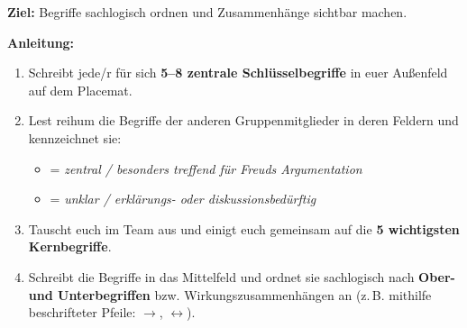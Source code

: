 \documentclass[a4paper, 11pt, parskip=half]{scrartcl}
\begin{document}
\begin{tcolorbox}[
    enhanced, colback=lightBlue, colframe=primaryBlue, boxrule=0.8pt, arc=1mm,
    title=\textbf{Methode: Strukturlegetechnik},
    fonttitle=\small\bfseries\color{white},
    boxed title style={colback=primaryBlue, arc=0mm, boxrule=0pt},
    attach boxed title to top left={yshift=-2mm, xshift=2mm},
    boxsep=5pt, bottom=6pt, top=7pt
]
\small\sffamily
\textbf{Ziel:} Begriffe sachlogisch ordnen und Zusammenhänge sichtbar machen.\par\smallskip
\textbf{Anleitung:}
\begin{enumerate}[leftmargin=0.55cm, itemsep=0.08cm, topsep=0.04cm]
    \item Schreibt jede/r für sich \textbf{5--8 zentrale Schlüsselbegriffe} in euer Außenfeld auf dem Placemat.
    \item Lest reihum die Begriffe der anderen Gruppenmitglieder in deren Feldern und kennzeichnet sie:
    \begin{itemize}[leftmargin=0.4cm, itemsep=0.02cm, label=\color{primaryBlue}\textbullet]
        \item[\textbf{!}] = \textit{zentral / besonders treffend für Freuds Argumentation}
        \item[\textbf{?}] = \textit{unklar / erklärungs- oder diskussionsbedürftig}
    \end{itemize}
    \item Tauscht euch im Team aus und einigt euch gemeinsam auf die \textbf{5 wichtigsten Kernbegriffe}.
    \item Schreibt die Begriffe in das Mittelfeld und ordnet sie sachlogisch nach \textbf{Ober- und Unterbegriffen} bzw. Wirkungszusammenhängen an (z.\,B. mithilfe beschrifteter Pfeile: $\rightarrow$, $\leftrightarrow$).
\end{enumerate}
\end{tcolorbox}
\end{document}
